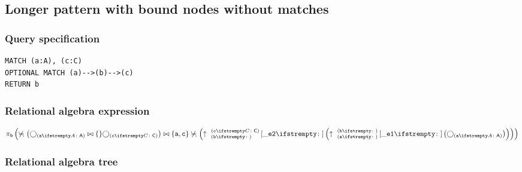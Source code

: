 
\subsection{Longer pattern with bound nodes without matches}

\subsubsection*{Query specification}

\begin{lstlisting}
MATCH (a:A), (c:C)
OPTIONAL MATCH (a)-->(b)-->(c)
RETURN b
\end{lstlisting}

\subsubsection*{Relational algebra expression}

$\projection{\var{b}} \left(\alldifferent{} \left(\getvertices{a}{A} \join \{\} \getvertices{c}{C}\right) \join \{\var{a}, \var{c}\} \alldifferent{} \left(\expandout{b}{c}{C}{\_e2}{} \left(\expandout{a}{b}{}{\_e1}{} \left(\getvertices{a}{A}\right)\right)\right)\right)$

\subsubsection*{Relational algebra tree}

